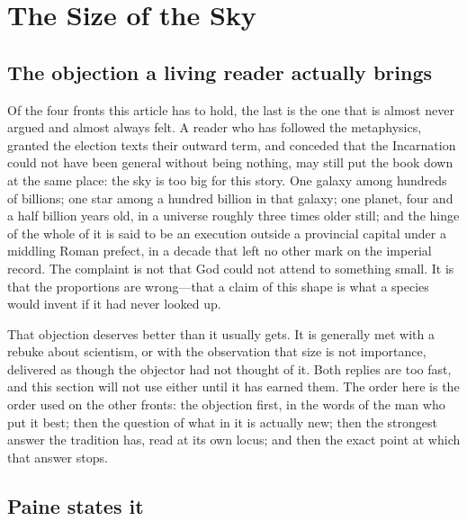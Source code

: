 \section{The Size of the Sky}

\subsection{The objection a living reader actually brings}

Of the four fronts this article has to hold, the last is the one that is almost never argued and almost always felt. A reader who has followed the metaphysics, granted the election texts their outward term, and conceded that the Incarnation could not have been general without being nothing, may still put the book down at the same place: the sky is too big for this story. One galaxy among hundreds of billions; one star among a hundred billion in that galaxy; one planet, four and a half billion years old, in a universe roughly three times older still; and the hinge of the whole of it is said to be an execution outside a provincial capital under a middling Roman prefect, in a decade that left no other mark on the imperial record. The complaint is not that God could not attend to something small. It is that the proportions are wrong---that a claim of this shape is what a species would invent if it had never looked up.

That objection deserves better than it usually gets. It is generally met with a rebuke about scientism, or with the observation that size is not importance, delivered as though the objector had not thought of it. Both replies are too fast, and this section will not use either until it has earned them. The order here is the order used on the other fronts: the objection first, in the words of the man who put it best; then the question of what in it is actually new; then the strongest answer the tradition has, read at its own locus; and then the exact point at which that answer stops.

\subsection{Paine states it}

